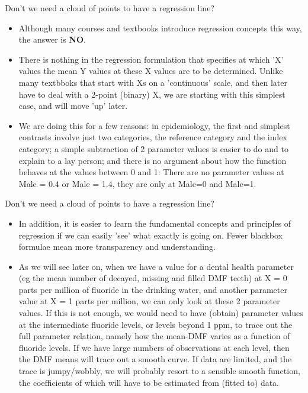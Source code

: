 \documentclass[10pt,handout]{beamer}\usepackage[]{graphicx}\usepackage[]{color}
\begin{document}
\begin{frame}{Don't we need a cloud of points to have a regression line?}
	\pause 
	\begin{itemize}
		\item Although many courses and textbooks introduce regression concepts this way, the answer is \textbf{NO}. \pause 
		
		\item There is nothing in the regression formulation that specifies at which 'X' values the mean Y values at these X values are to be determined. Unlike many textbboks that start with Xs on a 'continuous' scale, and then later have to deal with a 2-point (binary) X, we are starting with this simplest case, and will move 'up' later. \pause 
		
		\item We are doing this for a few reasons: in epidemiology, the first and simplest contrasts involve just two categories, the reference category and the index category; a simple subtraction of 2 parameter values is easier to do and to explain to a lay person; and there is no argument about how the function behaves at the values between 0 and 1:  There are no parameter values at Male = 0.4 or Male = 1.4, they are only at Male=0 and Male=1. 
 
	\end{itemize}
\end{frame}

\begin{frame}{Don't we need a cloud of points to have a regression line?}
	
		\begin{itemize}
			
		\item In addition, it is easier to learn the fundamental concepts and principles of regression if we can easily 'see' what exactly is going on. Fewer blackbox formulae mean more transparency and understanding. \pause 
		
		\item As we will see later on, when we have a value for a dental health parameter (eg the mean number of decayed, missing and filled DMF teeth) at X = 0 parts per million of fluoride in the drinking water, and another parameter value at X = 1 parts per million, we can only look at these 2 parameter values. If this is not enough, we would need to have (obtain) parameter values at the intermediate fluoride levels, or levels beyond 1 ppm, to trace out the full parameter relation, namely  how the mean-DMF varies as a function of fluoride levels. If we have large numbers of observations at each level, then the DMF means will trace out a smooth curve. If data are limited, and the trace is jumpy/wobbly, we will probably resort to a sensible smooth function, the coefficients of which will have to be estimated from (fitted to) data. 
	\end{itemize}
\end{frame}
\end{document}
